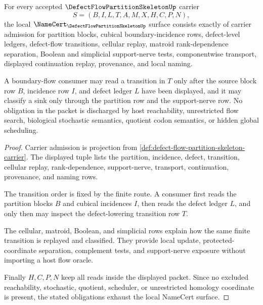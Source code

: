 \begin{theorem}
\label{thm:defect-flow-partition-skeleton-namecert-obligations}
For every accepted $\DefectFlowPartitionSkeletonUp$ carrier
$$
S=(B,I,L,T,A,M,X,H,C,P,N),
$$
the local $\NameCert_{\DefectFlowPartitionSkeletonUp}$ surface consists exactly of carrier admission for partition blocks, cubical boundary-incidence rows, defect-level ledgers, defect-flow transitions, cellular replay, matroid rank-dependence separation, Boolean and simplicial support-nerve tests, componentwise transport, displayed continuation replay, provenance, and local naming.

A boundary-flow consumer may read a transition in $T$ only after the source block row $B$, incidence row $I$, and defect ledger $L$ have been displayed, and it may classify a sink only through the partition row and the support-nerve row. No obligation in the packet is discharged by host reachability, unrestricted flow search, biological stochastic semantics, quotient codon semantics, or hidden global scheduling.
\end{theorem}
\begin{proof}
Carrier admission is projection from \autoref{def:defect-flow-partition-skeleton-carrier}. The displayed tuple lists the partition, incidence, defect, transition, cellular replay, rank-dependence, support-nerve, transport, continuation, provenance, and naming rows.

The transition order is fixed by the finite route. A consumer first reads the partition blocks $B$ and cubical incidences $I$, then reads the defect ledger $L$, and only then may inspect the defect-lowering transition row $T$.

The cellular, matroid, Boolean, and simplicial rows explain how the same finite transition is replayed and classified. They provide local update, protected-coordinate separation, complement tests, and support-nerve exposure without importing a host flow oracle.

Finally $H,C,P,N$ keep all reads inside the displayed packet. Since no excluded reachability, stochastic, quotient, scheduler, or unrestricted homology coordinate is present, the stated obligations exhaust the local NameCert surface.
\end{proof}


